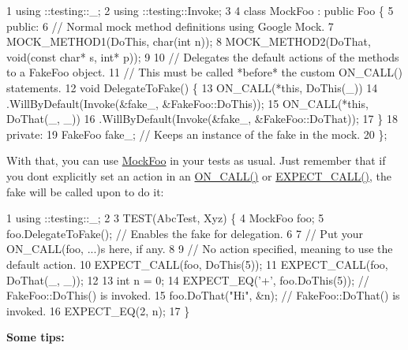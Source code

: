 \begin{DoxyCode}
1 using ::testing::\_;
2 using ::testing::Invoke;
3 
4 class MockFoo : public Foo \{
5  public:
6   // Normal mock method definitions using Google Mock.
7   MOCK\_METHOD1(DoThis, char(int n));
8   MOCK\_METHOD2(DoThat, void(const char* s, int* p));
9 
10   // Delegates the default actions of the methods to a FakeFoo object.
11   // This must be called *before* the custom ON\_CALL() statements.
12   void DelegateToFake() \{
13     ON\_CALL(*this, DoThis(\_))
14         .WillByDefault(Invoke(&fake\_, &FakeFoo::DoThis));
15     ON\_CALL(*this, DoThat(\_, \_))
16         .WillByDefault(Invoke(&fake\_, &FakeFoo::DoThat));
17   \}
18  private:
19   FakeFoo fake\_;  // Keeps an instance of the fake in the mock.
20 \};
\end{DoxyCode}


With that, you can use {\ttfamily \hyperlink{classMockFoo}{Mock\+Foo}} in your tests as usual. Just remember that if you don\textquotesingle{}t explicitly set an action in an {\ttfamily \hyperlink{gmock-spec-builders_8h_a5b12ae6cf84f0a544ca811b380c37334}{O\+N\+\_\+\+C\+A\+L\+L()}} or {\ttfamily \hyperlink{gmock-spec-builders_8h_a535a6156de72c1a2e25a127e38ee5232}{E\+X\+P\+E\+C\+T\+\_\+\+C\+A\+L\+L()}}, the fake will be called upon to do it\+:


\begin{DoxyCode}
1 using ::testing::\_;
2 
3 TEST(AbcTest, Xyz) \{
4   MockFoo foo;
5   foo.DelegateToFake(); // Enables the fake for delegation.
6 
7   // Put your ON\_CALL(foo, ...)s here, if any.
8 
9   // No action specified, meaning to use the default action.
10   EXPECT\_CALL(foo, DoThis(5));
11   EXPECT\_CALL(foo, DoThat(\_, \_));
12 
13   int n = 0;
14   EXPECT\_EQ('+', foo.DoThis(5));  // FakeFoo::DoThis() is invoked.
15   foo.DoThat("Hi", &n);           // FakeFoo::DoThat() is invoked.
16   EXPECT\_EQ(2, n);
17 \}
\end{DoxyCode}


{\bfseries Some tips\+:}


